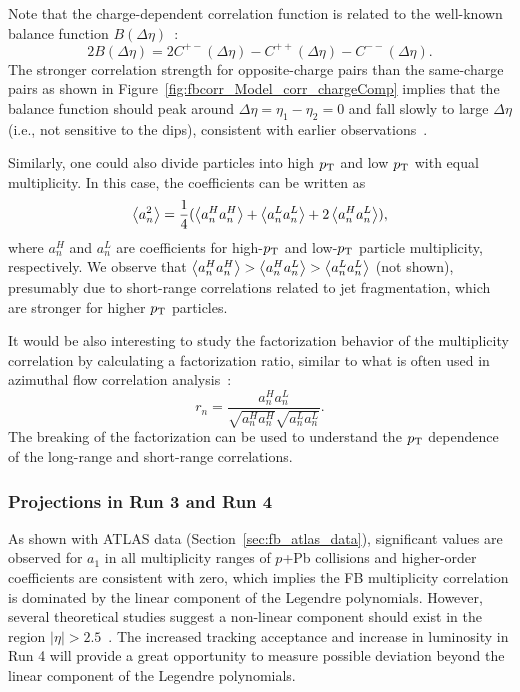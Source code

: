 Note that the charge-dependent correlation function is related to the well-known balance function $B(\Delta\eta)$~\cite{Bass:2000az}:
\begin{equation}
2 B(\Delta\eta) = 2 C^{+-}(\Delta\eta) - C^{++}(\Delta\eta) - C^{--}(\Delta\eta).
\end{equation}
The stronger correlation strength for opposite-charge pairs than the same-charge pairs as shown in Figure~\ref{fig:fbcorr_Model_corr_chargeComp} implies that the balance function should peak around $\Delta\eta = \eta_1 - \eta_2 = 0$ and fall slowly to large $\Delta\eta$ (i.e., not sensitive to the dips), consistent with earlier observations~\cite{Adams:2003kg, Abelev:2013csa}.

Similarly, one could also divide particles into high $p_\text{T}$ and low $p_\text{T}$ with equal multiplicity. In this case, the coefficients can be written as
\begin{equation}
\left\langle a_n^2\right\rangle = \frac{1}{4}(\left\langle a_n^H a_n^H\right\rangle + \left\langle a_n^L a_n^L\right\rangle + 2 \left\langle a_n^H a_n^L\right\rangle),
\end{equation}
where $a_n^H$ and $a_n^L$ are coefficients for high-$p_\text{T}$ and low-$p_\text{T}$ particle multiplicity, respectively. We observe that $\left\langle a_n^H a_n^H\right\rangle > \left\langle a_n^H a_n^L\right\rangle > \left\langle a_n^L a_n^L\right\rangle$ (not shown), presumably due to short-range correlations related to jet fragmentation, which are stronger for higher $p_\text{T}$ particles.

It would be also interesting to study the factorization behavior of the multiplicity correlation by calculating a factorization ratio, similar to what is often used in azimuthal flow correlation analysis~\cite{Gardim:2012im}:
\begin{equation}
r_n = \frac{a_n^H a_n^L}{\sqrt{a_n^H a_n^H} \sqrt{a_n^L a_n^L}}.
\end{equation}
The breaking of the factorization can be used to understand the $p_\text{T}$ dependence of the long-range and short-range correlations.



\subsubsection{Projections in Run 3 and Run 4}

As shown with ATLAS data (Section~\ref{sec:fb_atlas_data}), significant values are observed for $a_1$ in all multiplicity ranges of $p$+Pb collisions and higher-order coefficients are consistent with zero, which implies the FB multiplicity correlation is dominated by the linear component of the Legendre polynomials. However, several theoretical studies suggest a non-linear component should exist in the region $|\eta|>2.5$~\cite{Bzdak:2012tp, Bhalerao:2014mua}. The increased tracking acceptance and increase in luminosity in Run 4 will provide a great opportunity to measure possible deviation beyond the linear component of the Legendre polynomials.

